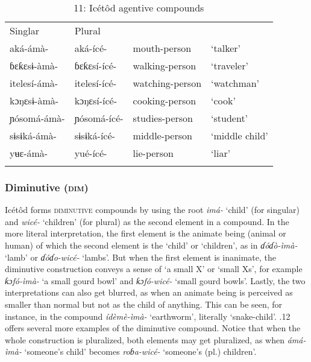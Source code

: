 \begin{table}
\caption{11: Icétôd agentive compounds}
\label{tab:4}


\begin{tabularx}{\textwidth}{XXXX}
\lsptoprule

Singlar & Plural &  & \\
aká-ámà- & aká-ícé- & mouth-person & ‘talker’\\
ɓɛƙɛsɨ-àmà- & ɓɛƙɛsí-ícé- & walking-person & ‘traveler’\\
itelesí-ámà- & itelesí-ícé- & watching-person & ‘watchman’\\
kɔŋɛsɨ-àmà- & kɔŋɛsí-ícé- & cooking-person & ‘cook’\\
ɲósomá-ámà- & ɲósomá-ícé- & studies-person & ‘student’\\
sɨsɨká-ámà- & sɨsɨká-ícé- & middle-person & ‘middle child’\\
yʉɛ-ámà- & yué-ícé- & lie-person & ‘liar’\\
\lspbottomrule
\end{tabularx}
\end{table}

\subsubsection{Diminutive (\textsc{dim})}

Icétôd forms \textsc{diminutive} compounds by using the root \textit{imá- }‘child’ (for singular) and \textit{wicé- }‘children’ (for plural) as the second element in a compound. In the more literal interpretation, the first element is the animate being (animal or human) of which the second element is the ‘child’ or ‘children’, as in \textit{ɗóɗò-ìmà- }‘lamb’ or \textit{ɗóɗo-wicé- }‘lambs’. But when the first element is inanimate, the diminutive construction conveys a sense of ‘a small X’ or ‘small Xs’, for example \textit{ƙɔfó-ìmà- }‘a small gourd bowl’ and \textit{ƙɔfó-wicé- }‘small gourd bowls’. Lastly, the two interpretations can also get blurred, as when an animate being is perceived as smaller than normal but not as the child of anything. This can be seen, for instance, in the compound \textit{ídèmè-ìmà- }‘earthworm’, literally ‘snake-child’. .12 offers several more examples of the diminutive compound. Notice that when the whole construction is pluralized, both elements may get pluralized, as when \textit{ámá-ìmà- }‘someone’s child’ becomes \textit{roɓa-wicé- }‘someone’s (pl.) children’.


